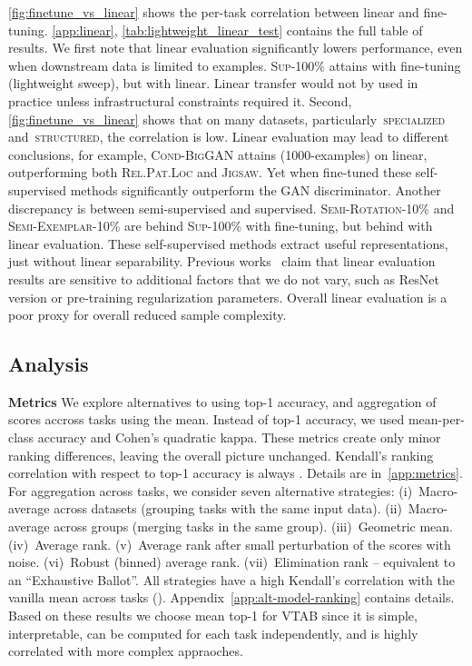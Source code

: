 \documentclass{article}
\newcommand{\myparagraph}[1]{\noindent\textbf{#1}\quad}
\DeclareRobustCommand{\taskSpecialized}{\raisebox{0.5pt}{\tikz{\fill[specialized] (0,0) circle (.5ex);}}\,\textsc{specialized}}
\DeclareRobustCommand{\taskStructured}{\raisebox{0.5pt}{\tikz{\fill[structured] (0,0) circle (.5ex);}}\,\textsc{structured}}
\begin{document}
\cref{fig:finetune_vs_linear} shows the per-task correlation between linear and fine-tuning.
\cref{app:linear}, \cref{tab:lightweight_linear_test} contains the full table of results.
We first note that linear evaluation significantly lowers performance, even when downstream data is limited to  examples.
\textsc{Sup-100\%} attains  with fine-tuning (lightweight sweep), but  with linear.
Linear transfer would not by used in practice unless infrastructural constraints required it.
Second, \cref{fig:finetune_vs_linear} shows that on many datasets, particularly \taskSpecialized{} and \taskStructured{}, the correlation is low.
Linear evaluation may lead to different conclusions, for example, \textsc{Cond-BigGAN} attains  (1000-examples) on linear, outperforming both \textsc{Rel.Pat.Loc} and \textsc{Jigsaw}.
Yet when fine-tuned these self-supervised methods significantly outperform the GAN discriminator.
Another discrepancy is between semi-supervised and supervised.
\textsc{Semi-Rotation-10\%} and \textsc{Semi-Exemplar-10\%} are  behind \textsc{Sup-100\%} with fine-tuning, but  behind with linear evaluation.
These self-supervised methods extract useful representations, just without linear separability.
Previous works~\citep{kornblith2018better,kolesnikov2019revisiting} claim that linear evaluation results are sensitive to additional factors that we do not vary, such as ResNet version or pre-training regularization parameters.
Overall linear evaluation is a poor proxy for overall reduced sample complexity.


\subsection{Analysis\label{sec:analysis}}

\myparagraph{Metrics}
We explore alternatives to using top-1 accuracy, and aggregation of scores accross tasks using the mean.
Instead of top-1 accuracy, we used mean-per-class accuracy and Cohen's quadratic kappa.
These metrics create only minor ranking differences, leaving the overall picture unchanged.
Kendall's ranking correlation with respect to top-1 accuracy is always .
Details are in~\ref{app:metrics}.
For aggregation across tasks, we consider seven alternative strategies:
(i)~Macro-average across datasets (grouping tasks with the same input data).
(ii)~Macro-average across groups (merging tasks in the same group).
(iii)~Geometric mean.
(iv)~Average rank.
(v)~Average rank after small perturbation of the scores with noise.
(vi)~Robust (binned) average rank.
(vii)~Elimination rank -- equivalent to an ``Exhaustive Ballot''.
All strategies have a high Kendall's correlation with the vanilla mean across tasks ().
Appendix~\ref{app:alt-model-ranking} contains details.
Based on these results we choose mean top-1 for VTAB since it is simple, interpretable, can be computed for each task independently, and is highly correlated with more complex appraoches.
\end{document}
